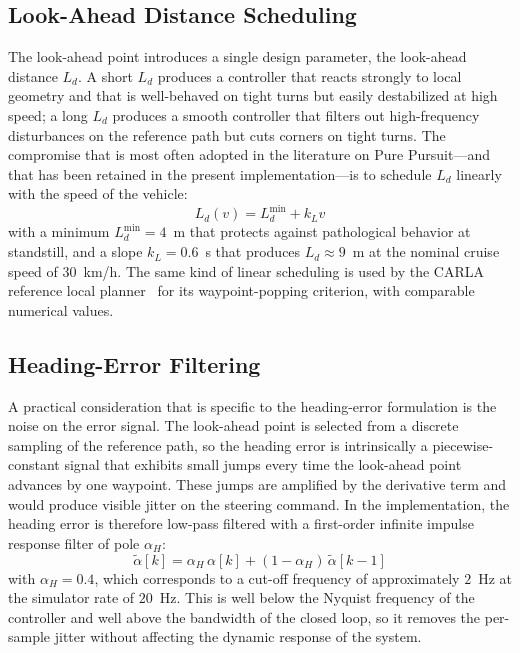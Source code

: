 \subsection{Look-Ahead Distance Scheduling}
The look-ahead point introduces a single design parameter, the look-ahead distance $L_d$. A short $L_d$ produces a controller that reacts strongly to local geometry and that is well-behaved on tight turns but easily destabilized at high speed; a long $L_d$ produces a smooth controller that filters out high-frequency disturbances on the reference path but cuts corners on tight turns. The compromise that is most often adopted in the literature on Pure Pursuit---and that has been retained in the present implementation---is to schedule $L_d$ linearly with the speed of the vehicle:
\begin{equation}
    L_d(v) = L_d^{\mathrm{min}} + k_L v
\end{equation}
with a minimum $L_d^{\mathrm{min}} = 4$~m that protects against pathological behavior at standstill, and a slope $k_L = 0.6$~s that produces $L_d \approx 9$~m at the nominal cruise speed of $30$~km/h. The same kind of linear scheduling is used by the CARLA reference local planner~\cite{local_planner} for its waypoint-popping criterion, with comparable numerical values.

\subsection{Heading-Error Filtering}
A practical consideration that is specific to the heading-error formulation is the noise on the error signal. The look-ahead point is selected from a discrete sampling of the reference path, so the heading error is intrinsically a piecewise-constant signal that exhibits small jumps every time the look-ahead point advances by one waypoint. These jumps are amplified by the derivative term and would produce visible jitter on the steering command. In the implementation, the heading error is therefore low-pass filtered with a first-order infinite impulse response filter of pole $\alpha_H$:
\begin{equation}
    \tilde{\alpha}[k] = \alpha_H\, \alpha[k] + (1 - \alpha_H)\, \tilde{\alpha}[k-1]
\end{equation}
with $\alpha_H = 0.4$, which corresponds to a cut-off frequency of approximately $2$~Hz at the simulator rate of $20$~Hz. This is well below the Nyquist frequency of the controller and well above the bandwidth of the closed loop, so it removes the per-sample jitter without affecting the dynamic response of the system.

